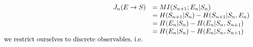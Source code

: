 \documentclass[12pt]{article}
\begin{document}
\begin{align}
\left.\begin{array} { r l } { J _ { n } ( E \rightarrow S ) } & { = M I ( S _ { n + 1} ; E _ { n } | S _ { n } ) } \\ { } & { = H ( S _ { n + 1} | S _ { n } ) - H ( S _ { n + 1} | S _ { n } ,E _ { n } ) } \\ { } & { = H ( E _ { n } | S _ { n } ) - H ( E _ { n } | S _ { n } ,S _ { n + 1} ) } \\ { } & { = H ( E _ { n } | S _ { n } ) - H ( E _ { n } | S _ { n } ,S _ { n + 1} ) } \\ { \text{ we restrict ourselves to discrete observables, i.e. } } \end{array} \right.
\end{align}
\end{document}
